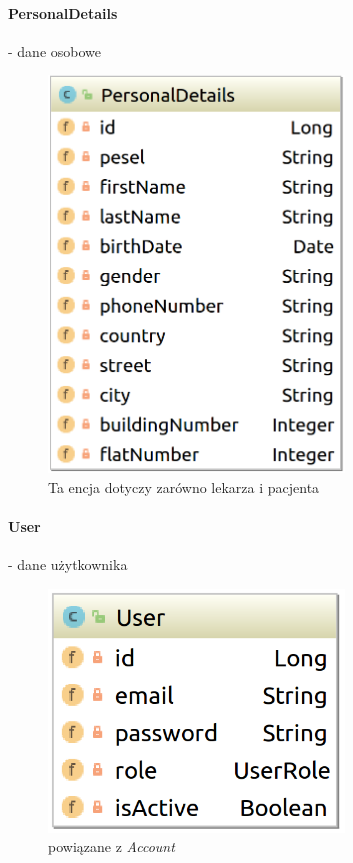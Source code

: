 \documentclass[polish,12pt]{aghthesis}
\begin{document}
    \paragraph{PersonalDetails} - dane osobowe 
    \begin{figure}[H]
        \includegraphics[width=0.7\textwidth]{PersonalDetails}
        \caption{Ta encja dotyczy zarówno lekarza i pacjenta}
    \end{figure}
    \paragraph{User} - dane użytkownika 
    \begin{figure}[H]
    \includegraphics[width=0.7\textwidth]{User}
    \caption{powiązane z \emph{Account}}
    \end{figure}
\end{document}
